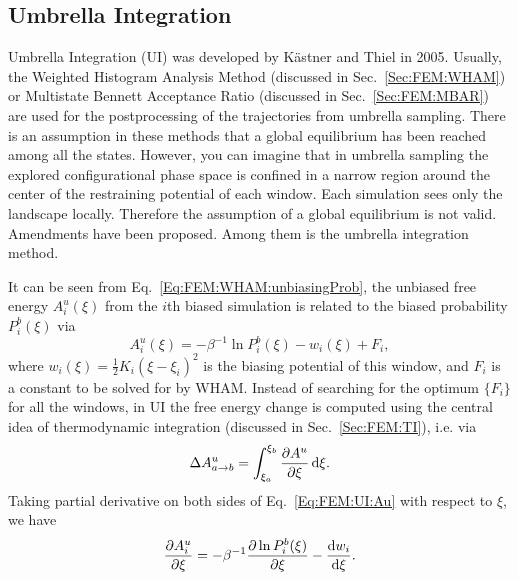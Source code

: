 \subsection{Umbrella Integration\label{Sec:FEM:UI}}
Umbrella Integration (UI) was developed by K\"astner and Thiel in 2005.\cite{KaestnerJCP2005} Usually, the Weighted Histogram Analysis Method (discussed in Sec.~\ref{Sec:FEM:WHAM}) or Multistate Bennett Acceptance Ratio (discussed in Sec.~\ref{Sec:FEM:MBAR}) are used for the postprocessing of the trajectories from umbrella sampling. There is an assumption in these methods that a global equilibrium has been reached among all the states. However, you can imagine that in umbrella sampling the explored configurational phase space is confined in a narrow region around the center of the restraining potential of each window. Each simulation sees only the landscape locally. Therefore the assumption of a global equilibrium is not valid. Amendments have been proposed. Among them is the umbrella integration method.

It can be seen from Eq.~\ref{Eq:FEM:WHAM:unbiasingProb}, the unbiased free energy $A_i^u(\xi)$ from the $i$th biased simulation is related to the biased probability $P_i^{b}(\xi)$ via
\begin{equation}
    A_i^u(\xi)=-\beta^{-1}\ln{P_i^{b}(\xi)}-w_i(\xi)+F_i,
    \label{Eq:FEM:UI:Au}
\end{equation}
where $w_i(\xi)=\frac{1}{2}K_i(\xi-\xi_i)^2$ is the biasing potential of this window, and $F_i$ is a constant to be solved for by WHAM. Instead of searching for the optimum $\{F_i\}$  for all the windows, in UI the free energy change is computed using the central idea of thermodynamic integration (discussed in Sec.~\ref{Sec:FEM:TI}), i.e. via
\begin{equation}
    \Delta A^u_{a\to b}=\int_{\xi_a}^{\xi_b}\frac{\partial A^u}{\partial \xi}\mathop{}\!\mathrm{d} \xi.
\end{equation}
Taking partial derivative on both sides of Eq.~\ref{Eq:FEM:UI:Au} with respect to $\xi$, we have
\begin{equation}
    \frac{\partial A_i^u}{\partial \xi}=-\beta^{-1}\frac{\partial \ln{P_i^b(\xi)}}{\partial \xi}-\frac{\mathop{}\!\mathrm{d} w_i}{\mathop{}\!\mathrm{d} \xi}.
    \label{Eq:FEM:UI:dAudxi}
\end{equation}

